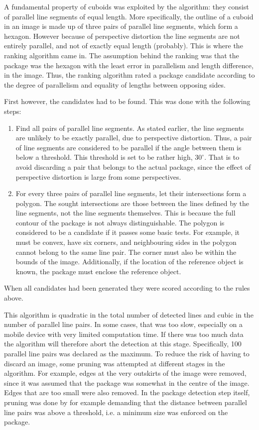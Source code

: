 A fundamental property of cuboids was exploited by the algorithm: they consist of parallel line segments of equal length. 
More specifically, the outline of a cuboid in an image is made up of three pairs of parallel line segments, which form a hexagon. 
However because of perspective distortion the line segments are not entirely parallel, and not of exactly equal length (probably).
This is where the ranking algorithm came in.
The assumption behind the ranking was that the package was the hexagon with the least error in parallelism and length difference, in the image.
Thus, the ranking algorithm rated a package candidate according to the degree of parallelism and equality of lengths between opposing sides.

First however, the candidates had to be found.
This was done with the following steps:
\begin{enumerate}
	\item Find all pairs of parallel line segments. 
		As stated earlier, the line segments are unlikely to be exactly parallel, due to perspective distortion.
		Thus, a pair of line segments are considered to be parallel if the angle between them is below a threshold.
		This threshold is set to be rather high, $30^\circ$. 
		That is to avoid discarding a pair that belongs to the actual package, since the effect of perspective distortion is large from some perspectives. %
	\item For every three pairs of parallel line segments, let their intersections form a polygon.
		The sought intersections are those between the lines defined by the line segments, not the line segments themselves.
		This is because the full contour of the package is not always distinguishable.
		The polygon is considered to be a candidate if it passes some basic tests.
		For example, it must be convex, have six corners, and neighbouring sides in the polygon cannot belong to the same line pair. 
		The corner must also be within the bounds of the image.
		Additionally, if the location of the reference object is known, the package must enclose the reference object.
\end{enumerate}

When all candidates had been generated they were scored according to the rules above.

This algorithm is quadratic in the total number of detected lines and cubic in the number of parallel line pairs.
In some cases, that was too slow, especially on a mobile device with very limited computation time.
If there was too much data the algorithm will therefore abort the detection at this stage.
Specifically, 100 parallel line pairs was declared as the maximum.
To reduce the risk of having to discard an image, some pruning was attempted at different stages in the algorithm.
For example, edges at the very outskirts of the image were removed, since it was assumed that the package was somewhat in the centre of the image.
Edges that are too small were also removed.
In the package detection step itself, pruning was done by for example demanding that the distance between parallel line pairs was above a threshold, i.e. a minimum size was enforced on the package.

